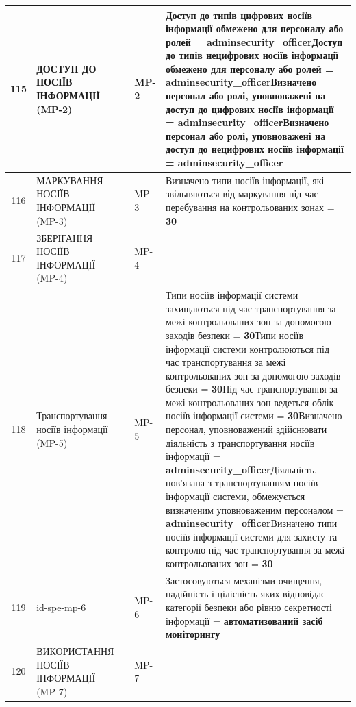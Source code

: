 \documentclass[10pt]{article}
\begin{document}
\begin{longtable}{|c|>{\raggedright\arraybackslash}p{2.5cm}|>{\raggedright\arraybackslash}p{4.5cm}|>{\raggedright\arraybackslash}p{3cm}|>{\raggedright\arraybackslash}p{4.5cm}|}
115 & ДОСТУП ДО НОСІЇВ ІНФОРМАЦІЇ (MP-2) &  & MP-2 & Доступ до типів цифрових носіїв інформації обмежено для персоналу або ролей = \textbf{adminsecurity\_\allowbreak{}officer}\newline Доступ до типів нецифрових носіїв інформації обмежено для персоналу або ролей = \textbf{adminsecurity\_\allowbreak{}officer}\newline Визначено персонал або ролі, уповноважені на доступ до цифрових носіїв інформації = \textbf{adminsecurity\_\allowbreak{}officer}\newline Визначено персонал або ролі, уповноважені на доступ до нецифрових носіїв інформації = \textbf{adminsecurity\_\allowbreak{}officer} \\ \hline
116 & МАРКУВАННЯ НОСІЇВ ІНФОРМАЦІЇ (MP-3) &  & MP-3 & Визначено типи носіїв інформації, які звільняються від маркування під час перебування на контрольованих зонах = \textbf{30} \\ \hline
117 & ЗБЕРІГАННЯ НОСІЇВ ІНФОРМАЦІЇ (MP-4) &  & MP-4 &  \\ \hline
118 & Транспортування носіїв інформації (MP-5) &  & MP-5 & Типи носіїв інформації системи захищаються під час транспортування за межі контрольованих зон за допомогою заходів безпеки = \textbf{30}\newline Типи носіїв інформації системи контролюються під час транспортування за межі контрольованих зон за допомогою заходів безпеки = \textbf{30}\newline Під час транспортування за межі контрольованих зон ведеться облік носіїв інформації системи = \textbf{30}\newline Визначено персонал, уповноважений здійснювати діяльність з транспортування носіїв інформації = \textbf{adminsecurity\_\allowbreak{}officer}\newline Діяльність, пов'язана з транспортуванням носіїв інформації системи, обмежується визначеним уповноваженим персоналом = \textbf{adminsecurity\_\allowbreak{}officer}\newline Визначено типи носіїв інформації системи для захисту та контролю під час транспортування за межі контрольованих зон = \textbf{30} \\ \hline
119 & id-spe-mp-6 &  & MP-6 & Застосовуються механізми очищення, надійність і цілісність яких відповідає категорії безпеки або рівню секретності інформації = \textbf{автоматизований засіб моніторингу} \\ \hline
120 & ВИКОРИСТАННЯ НОСІЇВ ІНФОРМАЦІЇ (MP-7) &  & MP-7 &  \\ \hline

\end{longtable}
\end{document}
